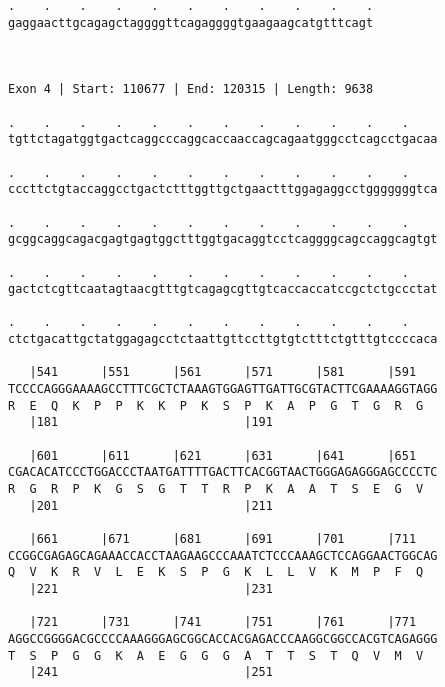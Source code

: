 \documentclass{article}
\begin{document}
\begin{Verbatim}
.    .    .    .    .    .    .    .    .    .    .
gaggaacttgcagagctaggggttcagaggggtgaagaagcatgtttcagt
                                                   
                                                   
 
Exon 4 | Start: 110677 | End: 120315 | Length: 9638
 
.    .    .    .    .    .    .    .    .    .    .    .    
tgttctagatggtgactcaggcccaggcaccaaccagcagaatgggcctcagcctgacaa
                                                            
.    .    .    .    .    .    .    .    .    .    .    .    
cccttctgtaccaggcctgactctttggttgctgaactttggagaggcctgggggggtca
                                                            
.    .    .    .    .    .    .    .    .    .    .    .    
gcggcaggcagacgagtgagtggctttggtgacaggtcctcaggggcagccaggcagtgt
                                                            
.    .    .    .    .    .    .    .    .    .    .    .    
gactctcgttcaatagtaacgtttgtcagagcgttgtcaccaccatccgctctgccctat
                                                            
.    .    .    .    .    .    .    .    .    .    .    .    
ctctgacattgctatggagagcctctaattgttccttgtgtctttctgtttgtccccaca
                                                            
   |541      |551      |561      |571      |581      |591   
TCCCCAGGGAAAAGCCTTTCGCTCTAAAGTGGAGTTGATTGCGTACTTCGAAAAGGTAGG
R  E  Q  K  P  P  K  K  P  K  S  P  K  A  P  G  T  G  R  G  
   |181                          |191                       
  
   |601      |611      |621      |631      |641      |651   
CGACACATCCCTGGACCCTAATGATTTTGACTTCACGGTAACTGGGAGAGGGAGCCCCTC
R  G  R  P  K  G  S  G  T  T  R  P  K  A  A  T  S  E  G  V  
   |201                          |211                       
  
   |661      |671      |681      |691      |701      |711   
CCGGCGAGAGCAGAAACCACCTAAGAAGCCCAAATCTCCCAAAGCTCCAGGAACTGGCAG
Q  V  K  R  V  L  E  K  S  P  G  K  L  L  V  K  M  P  F  Q  
   |221                          |231                       
  
   |721      |731      |741      |751      |761      |771   
AGGCCGGGGACGCCCCAAAGGGAGCGGCACCACGAGACCCAAGGCGGCCACGTCAGAGGG
T  S  P  G  G  K  A  E  G  G  G  A  T  T  S  T  Q  V  M  V  
   |241                          |251                       
  

\end{Verbatim}
\end{document}
